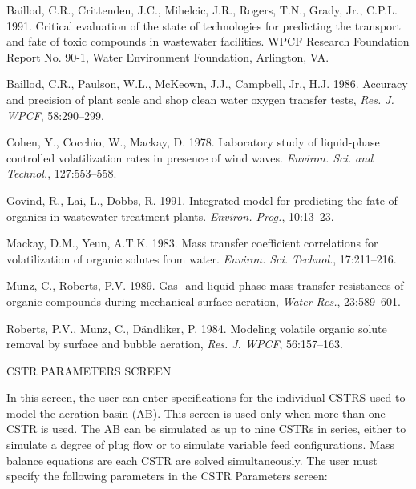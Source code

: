 
Baillod, C.R., Crittenden, J.C., Mihelcic, J.R., Rogers, T.N., Grady, Jr.,
C.P.L. 1991. Critical evaluation of the state of technologies for predicting
the transport and fate of toxic compounds in wastewater facilities. WPCF
Research Foundation Report No. 90-1, Water Environment Foundation, Arlington,
VA.

Baillod, C.R., Paulson, W.L., McKeown, J.J., Campbell, Jr., H.J. 1986. Accuracy
and precision of plant scale and shop clean water oxygen transfer tests, {\it
Res. J. WPCF}, 58:290--299.

Cohen, Y., Cocchio, W., Mackay, D. 1978. Laboratory study of liquid-phase
controlled volatilization rates in presence of wind waves. {\it Environ. Sci.
and Technol.}, 127:553--558.

Govind, R., Lai, L., Dobbs, R. 1991. Integrated model for predicting the fate
of organics in wastewater treatment plants. {\it Environ. Prog.}, 10:13--23.

Mackay, D.M., Yeun, A.T.K. 1983. Mass transfer coefficient correlations for
volatilization of organic solutes from water. {\it Environ. Sci. Technol.},
17:211--216. 

Munz, C., Roberts, P.V. 1989. Gas- and liquid-phase mass transfer resistances
of organic compounds during mechanical surface aeration, {\it Water Res.},
23:589--601.

Roberts, P.V., Munz, C., D\"andliker, P. 1984. Modeling volatile organic solute
removal by surface and bubble aeration, {\it Res. J. WPCF}, 56:157--163.




\newpage

CSTR PARAMETERS SCREEN

In this screen, the user can enter specifications for the individual CSTRS used
to model the aeration basin (AB). This screen is used only when more than one
CSTR is used.  The AB can be simulated as up to nine CSTRs in series, either to
simulate a degree of plug flow or to simulate variable feed configurations.
Mass balance equations are each CSTR are solved simultaneously.  The user must
specify the following parameters in the CSTR Parameters screen:

